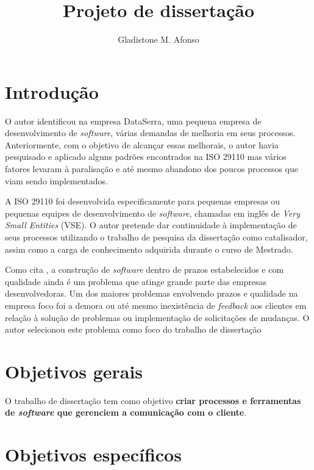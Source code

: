 
\newcommand{\sw}{\textit{software}\xspace}
\newcommand{\iso}{ISO 29110\xspace}

\title{Projeto de dissertação}
\author{Gladistone M. Afonso}
\date{} %

\maketitle

\section{Introdução}

O autor identificou na empresa DataSerra, uma pequena empresa de desenvolvimento de \sw, várias demandas de melhoria em seus processos. Anteriormente, com o objetivo de alcançar essas melhorais, o autor havia pesquisado e aplicado alguns padrões encontrados na \iso mas vários fatores levaram à paralisação e até mesmo abandono dos poucos processos que viam sendo implementados.

A \iso foi desenvolvida especificamente para pequenas empresas ou pequenas equipes de desenvolvimento de \sw, chamadas em inglês de \textit{Very Small Entities} (VSE). O autor pretende dar continuidade à implementação de seus processos utilizando o trabalho de pesquisa da dissertação como catalisador, assim como a carga de conhecimento adquirida durante o curso de Mestrado.

Como cita \cite{pressman}, a construção de \sw dentro de prazos estabelecidos e com qualidade ainda é um problema que atinge grande parte das empresas desenvolvedoras. Um dos maiores problemas envolvendo prazos e qualidade na empresa foco foi a demora ou até mesmo inexistência de \textit{feedback} aos clientes em relação à solução de problemas ou implementação de solicitações de mudanças. O autor selecionou este problema como foco do trabalho de dissertação 

\section{Objetivos gerais}

O trabalho de dissertação tem como objetivo \textbf{criar processos e ferramentas de \sw que gerenciem a comunicação com o cliente}.

\section{Objetivos específicos}

